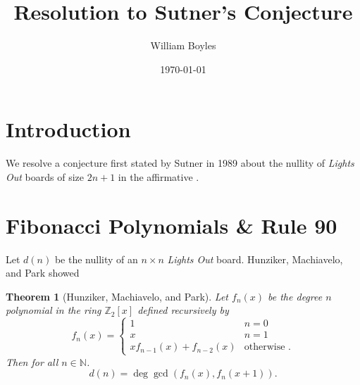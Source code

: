 \documentclass[a4paper]{article}
\newtheorem{theorem}{Theorem}
\newcommand{\Z}{\mathbb{Z}}
\newcommand{\N}{\mathbb{N}}
\begin{document}
	\title{Resolution to Sutner's Conjecture}
	\author{William Boyles}
	\date{\today}
	\maketitle
	
	\section{Introduction}
	We resolve a conjecture first stated by Sutner in 1989 about the nullity of \textit{Lights Out} boards of size $2n + 1$ in the affirmative \cite{Sutner1989}.
	
	\section{Fibonacci Polynomials \& Rule 90}
	Let $d(n)$ be the nullity of an $n \times n$ \textit{Lights Out} board.
	Hunziker, Machiavelo, and Park showed \cite{HUNZIKER2004465}
	
	\begin{theorem}[Hunziker, Machiavelo, and Park]
		Let $f_n(x)$ be the degree $n$ polynomial in the ring $\Z_2[x]$ defined recursively by
		\begin{equation*}
			f_n(x) = \begin{cases}
				1 & n=0 \\
				x & n=1 \\
				xf_{n-1}(x) + f_{n-2}(x) & \text{otherwise }.
			\end{cases}
		\end{equation*}
		Then for all $n \in \N$.
		\begin{equation*}
			d(n) = \deg{\gcd\left(f_{n}(x), f_{n}(x+1)\right)}.
		\end{equation*}
	\end{theorem}
	
\end{document}
